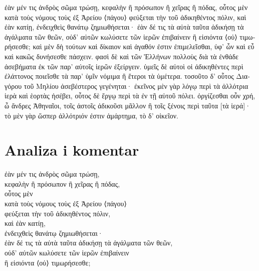 {\large

\begin{greek}

\noindent ἐὰν μέν τις ἀνδρὸς σῶμα τρώσῃ, κεφαλὴν ἢ πρόσωπον ἢ χεῖρας ἢ πόδας, οὗτος μὲν κατὰ τοὺς νόμους τοὺς ἐξ Ἀρείου ⟨πάγου⟩ φεύξεται τὴν τοῦ ἀδικηθέντος πόλιν, καὶ ἐὰν κατίῃ, ἐνδειχθεὶς θανάτῳ ζημιωθήσεται· ἐὰν δέ τις τὰ αὐτὰ ταῦτα ἀδικήσῃ τὰ ἀγάλματα τῶν θεῶν, οὐδ' αὐτῶν κωλύσετε τῶν ἱερῶν ἐπιβαίνειν ἢ εἰσιόντα ⟨οὐ⟩ τιμωρήσεσθε; καὶ μὲν δὴ τούτων καὶ δίκαιον καὶ ἀγαθόν ἐστιν ἐπιμελεῖσθαι, ὑφ' ὧν καὶ εὖ καὶ κακῶς δυνήσεσθε πάσχειν. φασὶ δὲ καὶ τῶν Ἑλλήνων πολλοὺς διὰ τὰ ἐνθάδε ἀσεβήματα ἐκ τῶν παρ' αὐτοῖς ἱερῶν ἐξείργειν. ὑμεῖς δὲ αὐτοὶ οἱ ἀδικηθέντες περὶ ἐλάττονος ποιεῖσθε τὰ παρ' ὑμῖν νόμιμα ἢ ἕτεροι τὰ ὑμέτερα. τοσοῦτο δ' οὗτος Διαγόρου τοῦ Μηλίου ἀσεβέστερος γεγένηται· ἐκεῖνος μὲν γὰρ λόγῳ περὶ τὰ ἀλλότρια ἱερὰ καὶ ἑορτὰς ἠσέβει, οὗτος δὲ ἔργῳ περὶ τὰ ἐν τῇ αὑτοῦ πόλει. ὀργίζεσθαι οὖν χρή, ὦ ἄνδρες Ἀθηναῖοι, τοῖς ἀστοῖς ἀδικοῦσι μᾶλλον ἢ τοῖς ξένοις περὶ ταῦτα [τὰ ἱερά]· τὸ μὲν γὰρ ὥσπερ ἀλλότριόν ἐστιν ἁμάρτημα, τὸ δ' οἰκεῖον.

\end{greek}

}


\section*{Analiza i komentar}


{\large
\begin{greek}
\noindent ἐὰν μέν τις ἀνδρὸς σῶμα τρώσῃ,\\
\tabto{2em} κεφαλὴν ἢ πρόσωπον ἢ χεῖρας ἢ πόδας,\\ 
οὗτος μὲν\\
\tabto{2em} κατὰ τοὺς νόμους τοὺς ἐξ Ἀρείου ⟨πάγου⟩\\
φεύξεται τὴν τοῦ ἀδικηθέντος πόλιν,\\
καὶ ἐὰν κατίῃ,\\
ἐνδειχθεὶς θανάτῳ ζημιωθήσεται·\\
ἐὰν δέ τις τὰ αὐτὰ ταῦτα ἀδικήσῃ τὰ ἀγάλματα τῶν θεῶν, \\
οὐδ' αὐτῶν κωλύσετε τῶν ἱερῶν ἐπιβαίνειν \\
ἢ εἰσιόντα ⟨οὐ⟩ τιμωρήσεσθε;\\

\end{greek}
}


